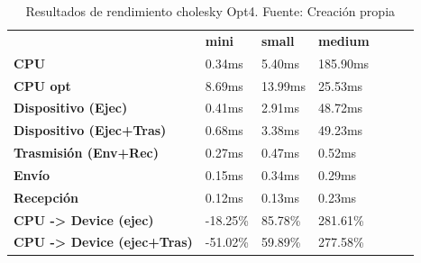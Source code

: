 \begin{table}[H]
    \centering
    \begin{tabular}{lllllll}
    \rowcolor[HTML]{DAE8FC} \ &  \textbf{mini} &  \textbf{	small} &  \textbf{	medium} \\
    \cellcolor[HTML]{DAE8FC} \textbf{CPU} & 0.34ms & 	5.40ms & 	185.90ms \\
    \rowcolor[HTML]{EFEFEF} \cellcolor[HTML]{DAE8FC} \textbf{CPU opt} & 8.69ms & 	13.99ms & 	25.53ms \\
    \cellcolor[HTML]{DAE8FC} \textbf{Dispositivo (Ejec)} & 0.41ms & 	2.91ms & 	48.72ms \\
    \rowcolor[HTML]{EFEFEF} \cellcolor[HTML]{DAE8FC} \textbf{Dispositivo (Ejec+Tras)} & 0.68ms & 	3.38ms & 	49.23ms \\
    \cellcolor[HTML]{DAE8FC} \textbf{Trasmisión (Env+Rec)} & 0.27ms & 	0.47ms & 	0.52ms \\
    \rowcolor[HTML]{EFEFEF} \cellcolor[HTML]{DAE8FC} \textbf{Envío} & 0.15ms & 	0.34ms & 	0.29ms \\
    \cellcolor[HTML]{DAE8FC} \textbf{Recepción} & 0.12ms & 	0.13ms & 	0.23ms \\
    \rowcolor[HTML]{EFEFEF} \cellcolor[HTML]{DAE8FC} \textbf{CPU -> Device (ejec)} & -18.25\% & 	85.78\% & 	281.61\% \\
    \cellcolor[HTML]{DAE8FC} \textbf{CPU -> Device (ejec+Tras)} & -51.02\% & 	59.89\% & 	277.58\% \\
    \end{tabular}
    \caption[Resultados de rendimiento cholesky Opt4]{{Resultados de rendimiento cholesky Opt4. Fuente: Creación propia}}
    \label{table_test_cholesky_Opt4_hw_performanceResults}
\end{table}